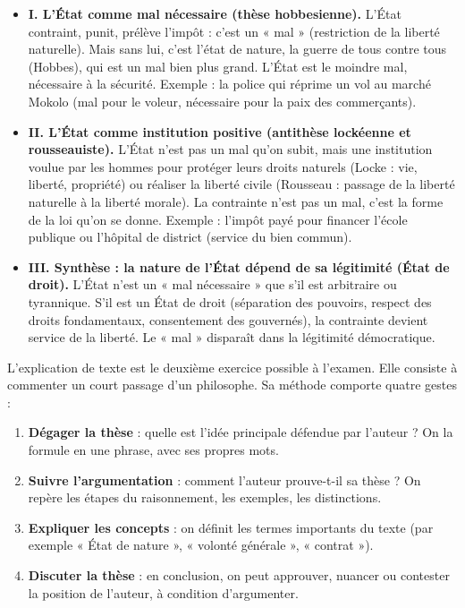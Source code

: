 \documentclass[11pt]{article}
\newcounter{popsec}
\newcounter{popsub}
\newcommand{\courssub}[1]{%
  \stepcounter{popsub}%
  \par\vspace{9pt}\noindent{\popxbold\fontsize{11.5}{13}\selectfont\color{popink}{\color{poporange}\thepopsec.\thepopsub}\hspace{6pt}#1}\par\nopagebreak\vspace{4pt}
}
\begin{document}
\begin{exemplebox}
\begin{itemize}
\item \textbf{I. L'État comme mal nécessaire (thèse hobbesienne).} L'État contraint, punit, prélève l'impôt : c'est un « mal » (restriction de la liberté naturelle). Mais sans lui, c'est l'état de nature, la guerre de tous contre tous (Hobbes), qui est un mal bien plus grand. L'État est le moindre mal, nécessaire à la sécurité. Exemple : la police qui réprime un vol au marché Mokolo (mal pour le voleur, nécessaire pour la paix des commerçants).
\item \textbf{II. L'État comme institution positive (antithèse lockéenne et rousseauiste).} L'État n'est pas un mal qu'on subit, mais une institution voulue par les hommes pour protéger leurs droits naturels (Locke : vie, liberté, propriété) ou réaliser la liberté civile (Rousseau : passage de la liberté naturelle à la liberté morale). La contrainte n'est pas un mal, c'est la forme de la loi qu'on se donne. Exemple : l'impôt payé pour financer l'école publique ou l'hôpital de district (service du bien commun).
\item \textbf{III. Synthèse : la nature de l'État dépend de sa légitimité (État de droit).} L'État n'est un « mal nécessaire » que s'il est arbitraire ou tyrannique. S'il est un État de droit (séparation des pouvoirs, respect des droits fondamentaux, consentement des gouvernés), la contrainte devient service de la liberté. Le « mal » disparaît dans la légitimité démocratique.
\end{itemize}
\end{exemplebox}

\courssub{La méthode de l'explication de texte}

L'explication de texte est le deuxième exercice possible à l'examen. Elle consiste à commenter un court passage d'un philosophe. Sa méthode comporte quatre gestes :

\begin{enumerate}
\item \textbf{Dégager la thèse} : quelle est l'idée principale défendue par l'auteur ? On la formule en une phrase, avec ses propres mots.
\item \textbf{Suivre l'argumentation} : comment l'auteur prouve-t-il sa thèse ? On repère les étapes du raisonnement, les exemples, les distinctions.
\item \textbf{Expliquer les concepts} : on définit les termes importants du texte (par exemple « État de nature », « volonté générale », « contrat »).
\item \textbf{Discuter la thèse} : en conclusion, on peut approuver, nuancer ou contester la position de l'auteur, à condition d'argumenter.
\end{enumerate}
\end{document}
